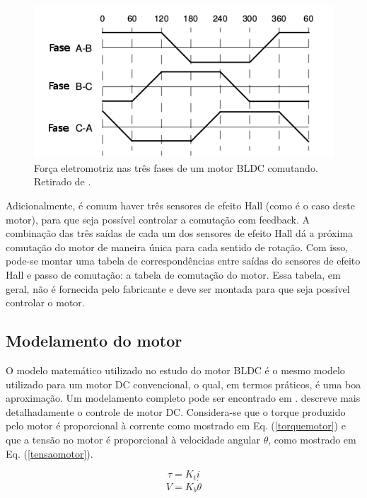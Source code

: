 \documentclass[10pt,fleqn,a4paper]{article}
\begin{document}
	\begin{figure}[ht]
		\begin{center}
			\includegraphics[angle=0, scale=0.5]{images/comutacao_review}
		\end{center}
		\caption{Força eletromotriz nas três fases de um motor BLDC comutando. Retirado de \cite{introducaobldc}.}
		\label{fig:comutacao}
	\end{figure}
    
    
    Adicionalmente, é comum haver três sensores de efeito Hall (como é o caso deste motor), para que seja possível controlar a comutação com feedback. A combinação das três saídas de cada um dos sensores de efeito Hall dá a próxima comutação do motor de maneira única para cada sentido de rotação. Com isso, pode-se montar uma tabela de correspondências entre saídas do sensores de efeito Hall e passo de comutação: a tabela de comutação do motor. Essa tabela, em geral, não é fornecida pelo fabricante e deve ser montada para que seja possível controlar o motor.
    
    \subsection{Modelamento do motor}
    
    O modelo matemático utilizado no estudo do motor BLDC é o mesmo modelo utilizado para um motor DC convencional, o qual, em termos práticos, é uma boa aproximação. Um modelamento completo pode ser encontrado em \cite{modelomotor}. \cite{livrocarta} descreve mais detalhadamente o controle de motor DC. Considera-se que o torque produzido pelo motor é proporcional à corrente como mostrado em Eq. (\ref{torquemotor}) e que a tensão no motor é proporcional à velocidade angular $\dot{\theta}$, como mostrado em Eq. (\ref{tensaomotor}).
    
    \begin{equation}
    \tau = K_ti \label{torquemotor}
    \end{equation}
    \begin{equation}
    V = K_b\dot{\theta} \label{tensaomotor}
    \end{equation}
    
\end{document}
